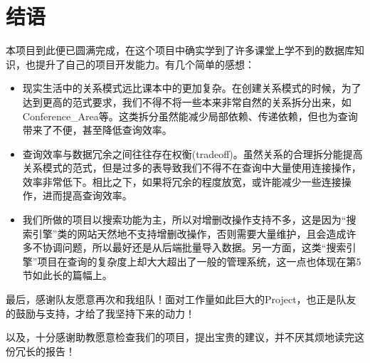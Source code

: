 
\section{结语}

本项目到此便已圆满完成，在这个项目中确实学到了许多课堂上学不到的数据库知识，也提升了自己的项目开发能力。有几个简单的感想：
\begin{itemize}
\item 现实生活中的关系模式远比课本中的更加复杂。在创建关系模式的时候，为了达到更高的范式要求，我们不得不将一些本来非常自然的关系拆分出来，如Conference\_Area等。这类拆分虽然能减少局部依赖、传递依赖，但也为查询带来了不便，甚至降低查询效率。
\item 查询效率与数据冗余之间往往存在权衡(tradeoff)。虽然关系的合理拆分能提高关系模式的范式，但是过多的表导致我们不得不在查询中大量使用连接操作，效率非常低下。相比之下，如果将冗余的程度放宽，或许能减少一些连接操作，进而提高查询效率。
\item 我们所做的项目以搜索功能为主，所以对增删改操作支持不多，这是因为“搜索引擎”类的网站天然地不支持增删改操作，否则需要大量维护，且会造成许多不协调问题，所以最好还是从后端批量导入数据。另一方面，这类“搜索引擎”项目在查询的复杂度上却大大超出了一般的管理系统，这一点也体现在第5节如此长的篇幅上。
\end{itemize}

最后，感谢队友愿意再次和我组队！面对工作量如此巨大的Project，也正是队友的鼓励与支持，才给了我坚持下来的动力！

以及，十分感谢助教愿意检查我们的项目，提出宝贵的建议，并不厌其烦地读完这份冗长的报告！